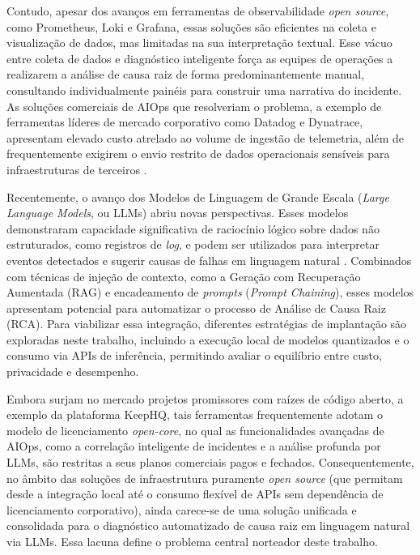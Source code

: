 Contudo, apesar dos avanços em ferramentas de observabilidade \emph{open source}, como Prometheus, Loki e Grafana, essas soluções são eficientes na coleta e visualização de dados, mas limitadas na sua interpretação textual. Esse vácuo entre coleta de dados e diagnóstico inteligente força as equipes de operações a realizarem a análise de causa raiz de forma predominantemente manual, consultando individualmente painéis para construir uma narrativa do incidente. As soluções comerciais de AIOps que resolveriam o problema, a exemplo de ferramentas líderes de mercado corporativo como Datadog e Dynatrace, apresentam elevado custo atrelado ao volume de ingestão de telemetria, além de frequentemente exigirem o envio restrito de dados operacionais sensíveis para infraestruturas de terceiros \cite{sharma2026top}.

Recentemente, o avanço dos Modelos de Linguagem de Grande Escala (\emph{Large Language Models}, ou LLMs) abriu novas perspectivas. Esses modelos demonstraram capacidade significativa de raciocínio lógico sobre dados não estruturados, como registros de \emph{log}, e podem ser utilizados para interpretar eventos detectados e sugerir causas de falhas em linguagem natural \cite{moura2024deteccao}. Combinados com técnicas de injeção de contexto, como a Geração com Recuperação Aumentada (RAG) e encadeamento de \emph{prompts} (\emph{Prompt Chaining}), esses modelos apresentam potencial para automatizar o processo de Análise de Causa Raiz (RCA). Para viabilizar essa integração, diferentes estratégias de implantação são exploradas neste trabalho, incluindo a execução local de modelos quantizados e o consumo via APIs de inferência, permitindo avaliar o equilíbrio entre custo, privacidade e desempenho.

Embora surjam no mercado projetos promissores com raízes de código aberto, a exemplo da plataforma KeepHQ, tais ferramentas frequentemente adotam o modelo de licenciamento \emph{open-core}, no qual as funcionalidades avançadas de AIOps, como a correlação inteligente de incidentes e a análise profunda por LLMs, são restritas a seus planos comerciais pagos e fechados. Consequentemente, no âmbito das soluções de infraestrutura puramente \emph{open source} (que permitam desde a integração local até o consumo flexível de APIs sem dependência de licenciamento corporativo), ainda carece-se de uma solução unificada e consolidada para o diagnóstico automatizado de causa raiz em linguagem natural via LLMs. Essa lacuna define o problema central norteador deste trabalho.

